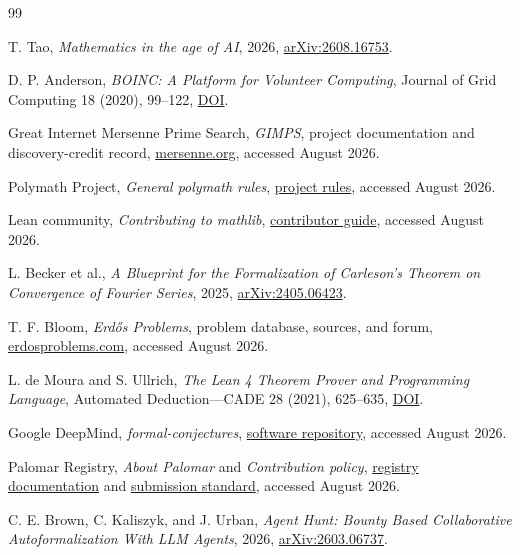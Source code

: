 \documentclass[10pt]{article}
\begin{document}
\begin{thebibliography}{99}

T. Tao, \emph{Mathematics in the age of AI}, 2026,
\href{https://arxiv.org/abs/2608.16753}{arXiv:2608.16753}.

D. P. Anderson, \emph{BOINC: A Platform for Volunteer Computing}, Journal of
Grid Computing 18 (2020), 99--122,
\href{https://doi.org/10.1007/s10723-019-09497-9}{DOI}.

Great Internet Mersenne Prime Search, \emph{GIMPS}, project documentation and
discovery-credit record, \href{https://www.mersenne.org/}{mersenne.org},
accessed August 2026.

Polymath Project, \emph{General polymath rules},
\href{https://polymathprojects.org/general-polymath-rules/}{project rules},
accessed August 2026.

Lean community, \emph{Contributing to mathlib},
\href{https://leanprover-community.github.io/contribute/index.html}{contributor guide},
accessed August 2026.

L. Becker et al., \emph{A Blueprint for the Formalization of Carleson's
Theorem on Convergence of Fourier Series}, 2025,
\href{https://arxiv.org/abs/2405.06423}{arXiv:2405.06423}.

T. F. Bloom, \emph{Erd\H{o}s Problems}, problem database, sources, and forum,
\href{https://www.erdosproblems.com/}{erdosproblems.com},
accessed August 2026.

L. de Moura and S. Ullrich, \emph{The Lean 4 Theorem Prover and Programming
Language}, Automated Deduction---CADE 28 (2021), 625--635,
\href{https://doi.org/10.1007/978-3-030-79876-5_37}{DOI}.

Google DeepMind, \emph{formal-conjectures},
\href{https://github.com/google-deepmind/formal-conjectures}{software repository},
accessed August 2026.

Palomar Registry, \emph{About Palomar} and \emph{Contribution policy},
\href{https://palomar-registry.org/about}{registry documentation} and
\href{https://github.com/PalomarRegistry/PalomarPolicy/blob/main/CONTRIBUTING.md}{submission standard},
accessed August 2026.

C. E. Brown, C. Kaliszyk, and J. Urban, \emph{Agent Hunt: Bounty Based
Collaborative Autoformalization With LLM Agents}, 2026,
\href{https://arxiv.org/abs/2603.06737}{arXiv:2603.06737}.


\end{thebibliography}
\end{document}

